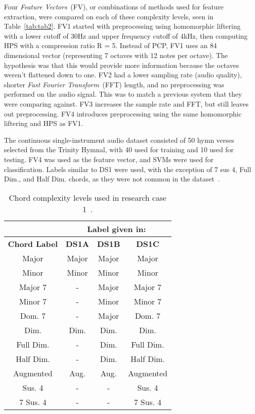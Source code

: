 \documentclass{sig-alternate}
\begin{document}
Four \textit{Feature Vectors}~(FV), or combinations of methods used for feature extraction, were compared on each of these complexity levels, seen in Table~\ref{tab:tab2}. FV1 started with preprocessing using homomorphic liftering with a lower cutoff of 30Hz and upper frequency cutoff of 4kHz, then computing HPS with a compression ratio R = 5. Instead of PCP, FV1 uses an 84 dimensional vector (representing 7 octaves with 12 notes per octave). The hypothesis was that this would provide more information because the octaves weren't flattened down to one. FV2 had a lower sampling rate (audio quality), shorter \textit{Fast Fourier Transform}~(FFT) length, and no preprocessing was performed on the audio signal. This was to match a previous system that they were comparing against. FV3 increases the sample rate and FFT, but still leaves out preprocessing. FV4 introduces preprocessing using the same homomorphic liftering and HPS as FV1.


The continuous single-instrument audio dataset consisted of 50 hymn verses selected from the Trinity Hymnal, with 40 used for training and 10 used for testing. FV4 was used as the feature vector, and SVMs were used for classification. Labels similar to DS1 were used, with the exception of 7 sus 4, Full Dim., and Half Dim. chords, as they were not common in the dataset~\cite{Morman:2006}.



\begin{table}
\centering
\begin{tabular}{|c|c|c|c|} \hline
&\multicolumn{3}{|c|}{\textbf{Label given in:}} \\ \hline
\textbf{Chord Label} & \textbf{DS1A} & \textbf{DS1B} & \textbf{DS1C} \\ \hline
Major & Major & Major & Major \\ \hline
Minor & Minor & Minor & Minor \\ \hline
Major 7 & - & Major & Major 7 \\ \hline
Minor 7 & - & Minor & Minor 7 \\ \hline
Dom. 7 & - & Major & Dom. 7 \\ \hline
Dim. & Dim. & Dim. & Dim. \\ \hline
Full Dim. & - & Dim. & Full Dim. \\ \hline
Half Dim. & - & Dim. & Half Dim. \\ \hline
Augmented & Aug. & Aug. & Augmented \\ \hline
Sus. 4 & - & - & Sus. 4 \\ \hline
7 Sus. 4 & - & - & 7 Sus. 4 \\ \hline
\end{tabular}
\caption{Chord complexity levels used in research case 1~\cite{Morman:2006}.}
\label{tab:tab1}
\end{table} 
\end{document}
